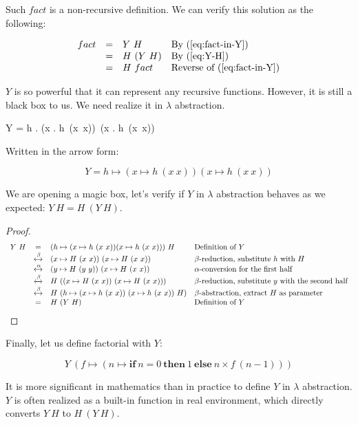 \documentclass{article}
\begin{document}
Such $fact$ is a non-recursive definition. We can verify this solution as the following:

\[
\begin{array}{rcll}
fact & = & Y\ H & \text{By (\ref{eq:fact-in-Y})} \\
     & = & H\ (Y\ H) & \text{By (\ref{eq:Y-H})} \\
     & = & H\ fact & \text{Reverse of (\ref{eq:fact-in-Y})}
\end{array}
\]

$Y$ is so powerful that it can represent any recursive functions. However, it is still a black box to us. We need realize it in $\lambda$ abstraction.

\be
Y = \lambda h . (\lambda x . h\ (x\ x))\ (\lambda x . h\ (x\ x))
\ee

Written in the arrow form:

\[
Y = h \mapsto (x \mapsto h\ (x\ x)) (x \mapsto h\ (x\ x))
\]

We are opening a magic box, let's verify if $Y$ in $\lambda$ abstraction behaves as we expected: $Y\ H = H\ (Y\ H)$.

\begin{proof}
\[
\begin{array}{rcll}
Y\ H & = & (h \mapsto (x \mapsto h\ (x\ x)) (x \mapsto h\ (x\ x)))\ H & \text{Definition of $Y$} \\
     & \xleftrightarrow{\beta} & (x \mapsto H\ (x\ x))\ (x \mapsto H\ (x\ x)) & \text{$\beta$-reduction, substitute $h$ with $H$} \\
     & \xleftrightarrow{\alpha} & (y \mapsto H\ (y\ y))\ (x \mapsto H\ (x\ x)) & \text{$\alpha$-conversion for the first half} \\
     & \xleftrightarrow{\beta} & H\ ((x \mapsto H\ (x\ x))\ (x \mapsto H\ (x\ x))) & \text{$\beta$-reduction, substitute $y$ with the second half} \\
     & \xleftrightarrow{\beta} & H\ (h \mapsto (x \mapsto h\ (x\ x))\ (x \mapsto h\ (x\ x))\ H) & \text{$\beta$-abstraction, extract $H$ as parameter} \\
     & = & H\ (Y\ H) & \text{Definition of $Y$}
\end{array}
\]
\end{proof}

Finally, let us define factorial with $Y$:

\[
Y\ (f \mapsto (n \mapsto \textbf{if}\ n = 0\ \textbf{then}\ 1\ \textbf{else}\ n \times f\ (n - 1)))
\]

It is more significant in mathematics than in practice to define $Y$ in $\lambda$ abstraction. $Y$ is often realized as a built-in function in real environment, which directly converts $Y\ H$ to $H\ (Y\ H)$.
\end{document}
